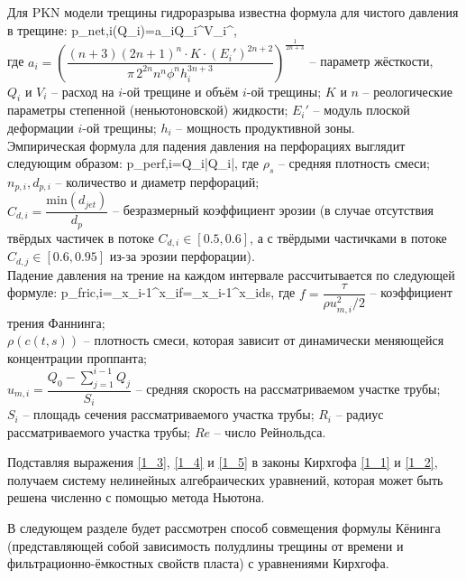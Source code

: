 Для PKN модели трещины гидроразрыва известна формула для чистого давления в трещине:
\beq\label{1_3}
p_{net,i}(Q_i)=a_iQ_i^{}V_i^{},
\eeq
\ \\
где $a_i=\left(\dfrac{(n+3)(2n+1)^n \cdot K\cdot (E_i')^{2n+2}}{\pi\, 2^{2n}n^n\phi^n h_i^{3n+3}}\right)^{\!\frac{1}{2n+3}}$ -- параметр жёсткости,\newline\\
$Q_i$ и $V_i$ -- расход на $i$-ой трещине и объём $i$-ой трещины;\newline
$K$ и $n$ -- реологические параметры степенной (неньютоновской) жидкости;\newline
$E_i'$ -- модуль плоской деформации $i$-ой трещины;\newline
$h_i$ -- мощность продуктивной зоны.
\\

Эмпирическая формула для падения давления на перфорациях выглядит следующим образом:
\beq\label{1_4}
\Delta p_{perf,i}=Q_i\left|Q_i\right|,
\eeq
где $\rho_s$ -- средняя плотность смеси;\newline
$n_{p,i}, d_{p,i}$ -- количество и диаметр перфораций;\newline\\
$C_{d,i}=\dfrac{\text{min}(d_{jet})}{d_p}$ -- безразмерный коэффициент эрозии (в случае отсутствия твёрдых частичек в потоке $C_{d,i}\in\left[0.5,0.6\right]$, а с твёрдыми частичками в потоке $C_{d,j}\in\left[0.6,0.95\right]$  из-за эрозии перфорации).
\\

Падение давления на трение на каждом интервале рассчитывается по следующей формуле:
\beq\label{1_5}
\Delta p_{fric,i}=\int\limits_{x_{i-1}}^{x_i}{f}=\int\limits_{x_{i-1}}^{x_i}{}ds,
\eeq
где $f=\dfrac{\tau}{\rho u_{m,i}^2/2}$ -- коэффициент трения Фаннинга;\newline\\
$\rho(c(t,s))$ -- плотность смеси, которая зависит от динамически меняющейся концентрации проппанта;\newline\\
$u_{m,i}=\dfrac{Q_0-\sum\limits_{j=1}^{i-1}{Q_j}}{S_i}$ -- средняя скорость на рассматриваемом участке трубы;\newline\\
$S_i$ -- площадь сечения рассматриваемого участка трубы;\newline
$R_i$ -- радиус рассматриваемого участка трубы;\newline
$Re$ -- число Рейнольдса.

Подставляя выражения \eqref{1_3}, \eqref{1_4} и \eqref{1_5} в законы Кирхгофа \eqref{1_1} и \eqref{1_2}, получаем систему нелинейных алгебраических уравнений, которая может быть решена численно с помощью метода Ньютона.

В следующем разделе будет рассмотрен способ совмещения формулы Кёнинга (представляющей собой зависимость полудлины трещины от времени и фильтрационно-ёмкостных свойств пласта) с уравнениями Кирхгофа.


